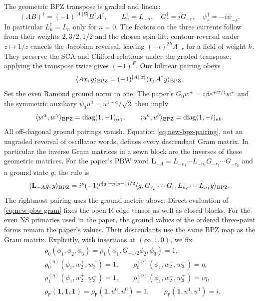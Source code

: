 The geometric BPZ transpose is graded and linear:
\begin{equation}
 (AB)^\dagger=(-1)^{|A||B|}B^\dagger A^\dagger,
 \qquad
 L_n^\dagger=L_{-n},\quad
 G_r^\dagger=iG_{-r},\quad
 \psi_r^\dagger=-i\psi_{-r}.
 \label{eq:new-bpz-modes}
\end{equation}
In particular $L_n^\dagger=L_n$ only for $n=0$.  The factors on
the three currents follow from their weights $2,3/2,1/2$ and the
chosen spin lift: contour reversal under $z\mapsto1/z$ cancels the
Jacobian reversal, leaving $(-i)^{2h}A_{-r}$ for a field of weight
$h$.  They preserve the SCA and Clifford relations under
the graded transpose; applying the transpose twice gives $(-1)^F$.
Our bilinear pairing obeys
\begin{equation}
 \langle Ax,y\rangle_{\rm BPZ}
 =(-1)^{|A||x|}\langle x,A^\dagger y\rangle_{\rm BPZ}.
 \label{eq:new-bpz-pairing}
\end{equation}
Set the even Ramond ground norm to one.  The paper's
$G_0w^\pm=i\beta e^{\mp i\pi/4}w^\mp$ and the symmetric auxiliary
$\psi_0u^a=u^{1-a}/\sqrt2$ then imply
\begin{equation}
 \langle w^\alpha,w^\gamma\rangle_{\rm BPZ}
 =\operatorname{diag}(1,-1)_{\alpha\gamma},\qquad
 \langle u^a,u^b\rangle_{\rm BPZ}
 =\operatorname{diag}(1,-i)_{ab}.
 \label{eq:new-ground-gram}
\end{equation}
All off-diagonal ground pairings vanish.  Equation
\eqref{eq:new-bpz-pairing}, not an ungraded reversal of oscillator
words, defines every descendant Gram matrix.  In particular the
inverse Gram matrices in a sewn block are the inverses of these
geometric matrices.  For the paper's PBW word
$\mathbf L_{-A}=L_{-n_1}\cdots L_{-n_\ell}
G_{-r_1}\cdots G_{-r_p}$ and a ground state $g$, the rule is
\begin{equation}
 \langle\mathbf L_{-A}g,y\rangle_{\rm BPZ}
 =i^p(-1)^{p|g|+p(p-1)/2}
  \langle g,G_{r_p}\cdots G_{r_1}
                   L_{n_\ell}\cdots L_{n_1}y\rangle_{\rm BPZ}.
 \label{eq:new-pbw-gram}
\end{equation}
The rightmost pairing uses the ground metric above.  Direct evaluation
of \eqref{eq:new-pbw-gram} fixes the open R-edge tensor as well as
closed blocks.  For the even NS primaries used in the paper,
the ground values of the ordered three-point forms remain the
paper's values.  Their descendants use the same BPZ map as the Gram
matrix.  Explicitly, with insertions at $(\infty,1,0)$, we fix
\begin{align}
 &\rho_0(\phi_1,\phi_2,\phi_3)
 =\rho_1(\phi_1,G_{-1/2}\phi_2,\phi_3)=1,\\
 &\rho^{(\eta)}_0(\phi_1,w^+_2,w^+_3)=1,\qquad
 \rho^{(\eta)}_0(\phi_1,w^-_2,w^-_3)=\eta,\\
 &\rho^{(\eta)}_1(\phi_1,w^+_2,w^-_3)=1,\qquad
 \rho^{(\eta)}_1(\phi_1,w^-_2,w^+_3)=i\eta,\\
 &\rho_{\mathsf F}(\mathbf1,\mathbf1,\mathbf1)
 =\rho_{\mathsf F}(\mathbf1,u^0,u^0)=1,\qquad
 \rho_{\mathsf F}(\mathbf1,u^1,u^1)=i.
 \label{eq:new-ground-vertices}
\end{align}

